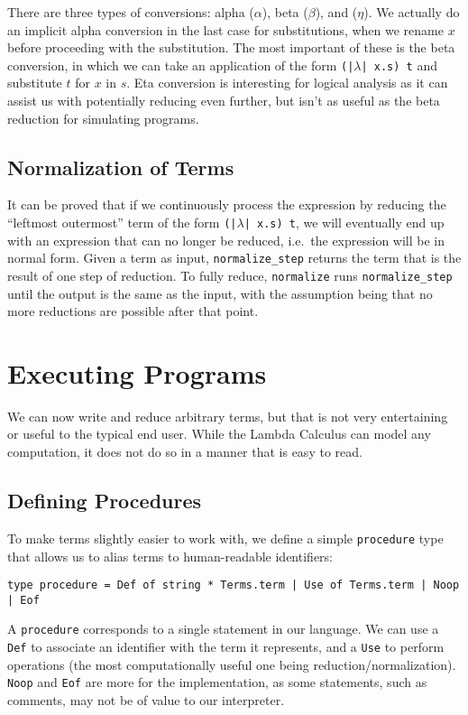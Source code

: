 \documentclass[12pt,letterpaper]{article}
\begin{document}
There are three types of conversions: alpha ($\alpha$), beta ($\beta$), and ($\eta$).
We actually do an implicit alpha conversion in the last case for substitutions, when we rename $x$ before proceeding with the substitution.
The most important of these is the beta conversion, in which we can take an application of the form \texttt{(|$\lambda$| x.s) t} and substitute $t$ for $x$ in $s$.
Eta conversion is interesting for logical analysis as it can assist us with potentially reducing even further, but isn't as useful as the beta reduction for simulating programs.

\subsection{Normalization of Terms}

It can be proved that if we continuously process the expression by reducing the \enquote{leftmost outermost} term of the form \texttt{(|$\lambda$| x.s) t}, we will eventually end up with an expression that can no longer be reduced, i.e.\ the expression will be in normal form.
Given a term as input, \texttt{normalize_step} returns the term that is the result of one step of reduction.
To fully reduce, \texttt{normalize} runs \texttt{normalize_step} until the output is the same as the input, with the assumption being that no more reductions are possible after that point.

\section{Executing Programs}

We can now write and reduce arbitrary terms, but that is not very entertaining or useful to the typical end user.
While the Lambda Calculus can model any computation, it does not do so in a manner that is easy to read.

\subsection{Defining Procedures}
To make terms slightly easier to work with, we define a simple \texttt{procedure} type that allows us to alias terms to human-readable identifiers:
\begin{verbatim}
type procedure = Def of string * Terms.term | Use of Terms.term | Noop | Eof
\end{verbatim}
A \texttt{procedure} corresponds to a single statement in our language.
We can use a \texttt{Def} to associate an identifier with the term it represents, and a \texttt{Use} to perform operations (the most computationally useful one being reduction/normalization).
\texttt{Noop} and \texttt{Eof} are more for the implementation, as some statements, such as comments, may not be of value to our interpreter.
\end{document}
